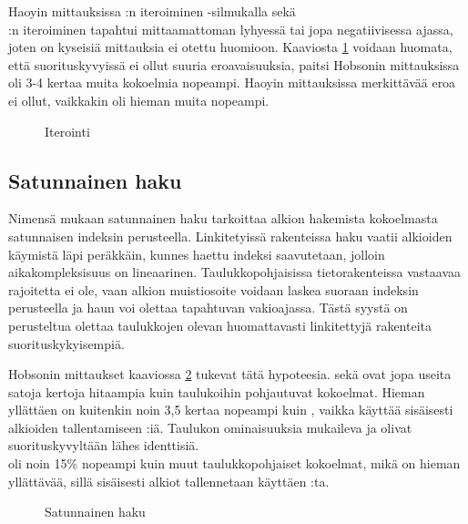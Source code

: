 Haoyin mittauksissa\cite{haoyiBenchmark} :n iteroiminen -silmukalla sekä \\:n iteroiminen tapahtui mittaamattoman lyhyessä tai jopa negatiivisessa ajassa, joten on kyseisiä mittauksia ei otettu huomioon. Kaaviosta \ref{iterointi_kaavio} voidaan huomata, että suorituskyvyissä ei ollut suuria eroavaisuuksia, paitsi Hobsonin mittauksissa\cite{hobsonBenchmark}  oli 3-4 kertaa muita kokoelmia nopeampi. Haoyin mittauksissa\cite{haoyiBenchmark} merkittävää eroa ei ollut, vaikkakin  oli hieman muita nopeampi.

\begin{figure}[h]
    \centering
    
    \caption{Iterointi}\label{iterointi_kaavio}
\end{figure}


\subsection{Satunnainen haku}
Nimensä mukaan satunnainen haku tarkoittaa alkion hakemista kokoelmasta satunnaisen indeksin perusteella. Linkitetyissä rakenteissa haku vaatii alkioiden käymistä läpi peräkkäin, kunnes haettu indeksi saavutetaan, jolloin aikakompleksisuus on lineaarinen. Taulukkopohjaisissa tietorakenteissa vastaavaa rajoitetta ei ole, vaan alkion muistiosoite voidaan laskea suoraan indeksin perusteella ja haun voi olettaa tapahtuvan vakioajassa. Tästä syystä on perusteltua olettaa taulukkojen olevan huomattavasti linkitettyjä rakenteita suorituskykyisempiä.

Hobsonin mittaukset\cite{hobsonBenchmark} kaaviossa \ref{satunnainenHaku_kaavio} tukevat tätä hypoteesia.  sekä  ovat jopa useita satoja kertoja hitaampia kuin taulukoihin pohjautuvat kokoelmat. Hieman yllättäen  on kuitenkin noin 3,5 kertaa nopeampi kuin , vaikka  käyttää sisäisesti alkioiden tallentamiseen :iä. Taulukon ominaisuuksia mukaileva  ja  olivat suorituskyvyltään lähes identtisiä. \\ oli noin 15\% nopeampi kuin muut taulukkopohjaiset kokoelmat, mikä on hieman yllättävää, sillä sisäisesti alkiot tallennetaan käyttäen :ta.

\begin{figure}[h]
    \centering
    
    \caption{Satunnainen haku}\label{satunnainenHaku_kaavio}
\end{figure}



